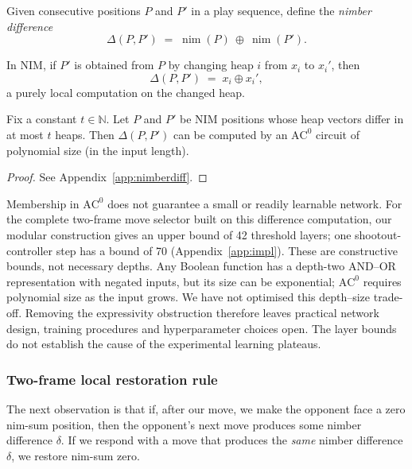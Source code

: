 \documentclass[twoside,11pt]{article}
\newcommand{\AC}{\mathrm{AC}}
\newcommand{\N}{\mathbb{N}}
\numberwithin{theorem}{section}
\numberwithin{equation}{section}
\begin{document}
\begin{definition}
\label{def:nimber-difference}
Given consecutive positions $P$ and $P'$ in a play sequence, define the \emph{nimber difference}
\[
\Delta(P,P') \;=\; \operatorname{nim}(P)\ \oplus\ \operatorname{nim}(P').
\]
\end{definition}

In NIM, if $P'$ is obtained from $P$ by changing heap $i$ from $x_i$ to $x_i'$, then
\[
\Delta(P,P') \;=\; x_i \oplus x_i',
\]
a purely local computation on the changed heap.

\begin{lemma}
\label{lem:nimber-diff-ac0}
Fix a constant $t\in\N$.
Let $P$ and $P'$ be NIM positions whose heap vectors differ in at most $t$ heaps.
Then $\Delta(P,P')$ can be computed by an $\AC^0$ circuit of polynomial size (in the input length).
\end{lemma}

\begin{proof}
See Appendix~\ref{app:nimberdiff}.
\end{proof}

Membership in $\AC^0$ does not guarantee a small or readily learnable network. For the complete two-frame move selector built on this difference computation, our modular construction gives an upper bound of 42 threshold layers; one shootout-controller step has a bound of 70 (Appendix~\ref{app:impl}). These are constructive bounds, not necessary depths. Any Boolean function has a depth-two AND--OR representation with negated inputs, but its size can be exponential; $\AC^0$ requires polynomial size as the input grows. We have not optimised this depth--size trade-off. Removing the expressivity obstruction therefore leaves practical network design, training procedures and hyperparameter choices open. The layer bounds do not establish the cause of the experimental learning plateaus.

\subsubsection{Two-frame local restoration rule}
\label{sec:restoration}

The next observation is that if, after our move, we make the opponent face a zero nim-sum position, then the opponent's next move produces some nimber difference $\delta$. If we respond with a move that produces the \emph{same} nimber difference $\delta$, we restore nim-sum zero.
\end{document}
